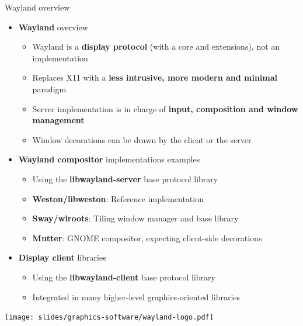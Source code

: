 \begin{frame}{Wayland overview}
  \begin{itemize}
  \item \textbf{Wayland} overview
    \begin{itemize}
    \item Wayland is a \textbf{display protocol} (with a core and extensions), not an implementation
    \item Replaces X11 with a \textbf{less intrusive, more modern and minimal} paradigm
    \item Server implementation is in charge of \textbf{input, composition and window management}
    \item Window decorations can be drawn by the client or the server
    \end{itemize}
  \end{itemize}
  \begin{minipage}[b]{0.8\textwidth}
  \begin{itemize}
  \item \textbf{Wayland compositor} implementations examples
    \begin{itemize}
    \item Using the \textbf{libwayland-server} base protocol library
    \item \textbf{Weston/libweston}: Reference implementation
    \item \textbf{Sway/wlroots}: Tiling window manager and base library
    \item \textbf{Mutter}: GNOME compositor, expecting client-side decorations
    \end{itemize}
  \item \textbf{Display client} libraries
    \begin{itemize}
    \item Using the \textbf{libwayland-client} base protocol library
    \item Integrated in many higher-level graphics-oriented libraries
    \end{itemize}
  \end{itemize}
  \end{minipage}
  \begin{minipage}[b]{0.15\textwidth}
  \texttt{[image: slides/graphics-software/wayland-logo.pdf]}
  \end{minipage}
\end{frame}

